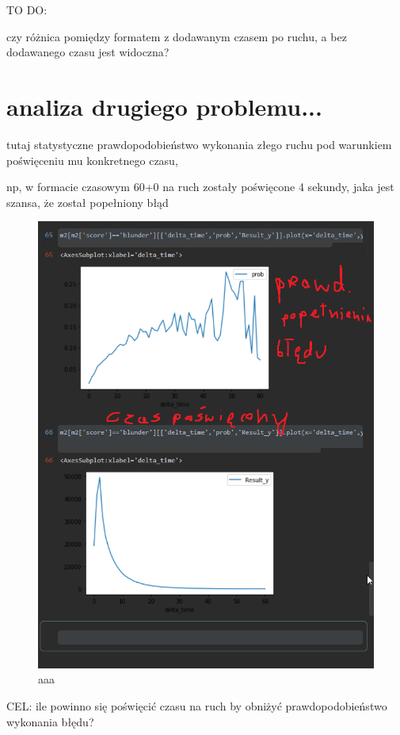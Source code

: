 \documentclass[inzynierska]{pwr_wmat_praca_dyplomowa}
\theoremstyle{plain}
\numberwithin{theorem}{chapter}
\theoremstyle{definition}
\numberwithin{theorem}{chapter}
\begin{document}
TO DO: 

czy różnica pomiędzy formatem z dodawanym czasem po ruchu, a bez dodawanego czasu jest widoczna?



\section{analiza drugiego problemu...}
tutaj statystyczne prawdopodobieństwo wykonania złego ruchu pod warunkiem poświęceniu mu konkretnego czasu,\newline

np, w formacie czasowym 60+0 na ruch zostały poświęcone 4 sekundy, jaka jest szansa, że został popełniony błąd \newline
\begin{figure}[H]
	\centering
	\includegraphics[width=\textwidth]{p_od_czasu.png}
	\caption{aaa}\label{aaa}
\end{figure}
CEL: 
ile powinno się poświęcić czasu na ruch by obniżyć prawdopodobieństwo wykonania błędu?\newline
\end{document}
